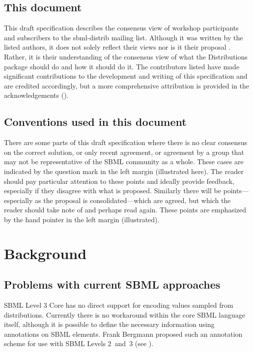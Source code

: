 \documentclass[draftspec]{sbmlpkgspec}
\newcommand{\distrib}{Distributions\xspace}
\newcommand{\watchout}{\marginpar{\hspace*{34pt}\raisebox{-0.5ex}{\Large\ding{43}}}}
\newcommand{\controversial}{\marginpar{\hspace*{34pt}\raisebox{-0.5ex}{\Large?}}}
\begin{document}
\subsection{This document}

This draft specification describes the consensus view of workshop participants and subscribers to the sbml-distrib mailing list. Although it was written by the listed authors, it does not solely reflect their views nor is it their proposal . Rather, it is their understanding of the consensus view of what the \distrib package should do and how it should do it. The contributors listed have made significant contributions to the development and writing of this specification and are credited accordingly, but a more comprehensive attribution is provided in the acknowledgements ().

\subsection{Conventions used in this document}

There are some
parts of this draft specification where there is no clear consensus on the
correct solution, or only recent agreement, or agreement by a group
that may not be representative of the SBML community as a
whole. These cases are indicated by the \controversial question mark
in the left margin (illustrated here). The reader should pay particular
attention to these points and ideally provide feedback, especially if
they disagree with what is proposed. Similarly there will be points---especially as the proposal is consolidated---which are agreed,
but which the reader should take note of and perhaps read again. These
points \watchout are emphasized by the hand pointer in the left margin
(illustrated).

\section{Background}

\subsection{Problems with current SBML approaches}

SBML Level 3 Core has no direct support for encoding values sampled from distributions. Currently there is no workaround within the core SBML
language itself, although it is possible to define the necessary information
using annotations on SBML elements. Frank Bergmann proposed such an annotation scheme for use with SBML Levels 2~and~3 (see ).
\end{document}
